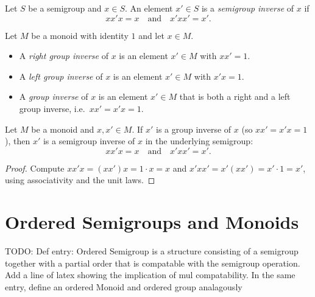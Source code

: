 \begin{definition}
\label{def:semigroup-inverse}
Let \(S\) be a semigroup and \(x\in S\). An element \(x'\in S\) is a \emph{semigroup inverse} of \(x\) if
\[
x x' x = x \quad\text{and}\quad x' x x' = x'.
\]
\end{definition}

\begin{definition}
\label{def:group-inverse}
Let \(M\) be a monoid with identity \(1\) and let \(x\in M\).
\begin{itemize}
  \item A \emph{right group inverse} of \(x\) is an element \(x'\in M\) with \(x x' = 1\).
  \item A \emph{left group inverse} of \(x\) is an element \(x'\in M\) with \(x' x = 1\).
  \item A \emph{group inverse} of \(x\) is an element \(x'\in M\) that is both a right and a left group inverse, i.e.\ \(x x' = x' x = 1\).
\end{itemize}
\end{definition}

\begin{lemma}
\label{lem:group-inverse-implies-semigroup-inverse}
Let \(M\) be a monoid and \(x,x'\in M\). If \(x'\) is a group inverse of \(x\) (so \(x x' = x' x = 1\)), then \(x'\) is a semigroup inverse of \(x\) in the underlying semigroup:
\[
x x' x = x \quad\text{and}\quad x' x x' = x'.
\]
\end{lemma}
\begin{proof}
Compute \(x x' x = (x x') x = 1\cdot x = x\) and \(x' x x' = x' (x x') = x' \cdot 1 = x'\), using associativity and the unit laws.
\end{proof}


\chapter {Ordered Semigroups and Monoids}

TODO: Def entry: Ordered Semigroup is a structure consisting of a semigroup together with a partial order that is compatable 
with the semigroup operation. Add a line of latex showing the implication of mul compatability.
In the same entry, define an ordered Monoid and ordered group analagously


